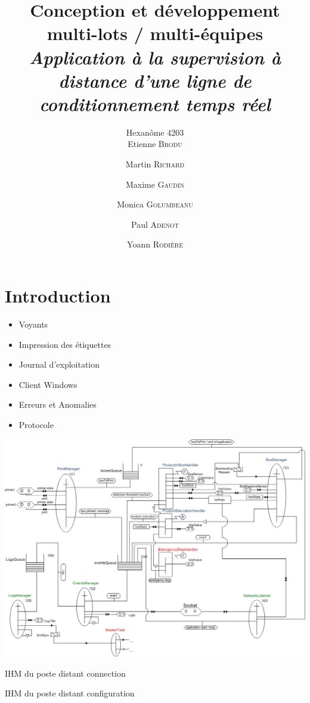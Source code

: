 \documentclass{beamer}
\title{Conception et développement multi-lots / multi-équipes\\ \emph{Application à la supervision à distance d'une ligne de conditionnement temps réel}}
\author{Hexanôme 4203\\ Etienne \textsc{Brodu} \and Martin \textsc{Richard} \and Maxime \textsc{Gaudin} \\ \and Monica \textsc{Golumbeanu} \and Paul \textsc{Adenot} \and Yoann \textsc{Rodière}}
\begin{document}
	\begin{frame}
		\titlepage
	\end{frame}

\section{Introduction}
	\begin{frame}
		\begin{itemize}	
			\item Voyants
			\item Impression des étiquettes %
			\item Journal d'exploitation
			\item Client Windows
			\item Erreurs et Anomalies
			\item Protocole
		\end{itemize}
	\end{frame}

	\begin{frame}
		\includegraphics[width=\textwidth]{../../SchemasLCG/schemaGlobal.png}
	\end{frame}

	\begin{frame}
		IHM du poste distant
		connection
	\end{frame}

	\begin{frame}
		IHM du poste distant
		configuration
	\end{frame}
\end{document}
